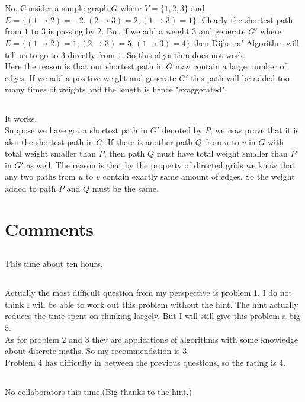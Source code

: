 \documentclass[12pt,letterpaper]{article}
\begin{document}
\section{}
\subsection{}
No. Consider a simple graph $G$ where $V=\{1,2,3\}$ and $E=\{(1\to2)=-2,(2\to3)=2,(1\to3)=1\}$. Clearly the shortest path from $1$ to $3$ is passing by $2$. But if we add a weight $3$ and generate $G'$ where $E=\{(1\to2)=1,(2\to3)=5,(1\to3)=4\}$ then Dijkstra' Algorithm will tell us to go to $3$ directly from $1$. So this algorithm does not work.\\
Here the reason is that our shortest path in $G$ may contain a large number of edges. If we add a positive weight and generate $G'$ this path will be added too many times of weights and the length is hence "exaggerated".
\subsection{}
It works. \\
Suppose we have got a shortest path in $G'$ denoted by $P$, we now prove that it is also the shortest path in $G$.
If there is another path $Q$ from $u$ to $v$ in $G$ with total weight smaller than $P$, then path $Q$ must have total weight smaller than $P$ in $G'$ as well. The reason is that by the property of directed grids we know that any two paths from $u$ to $v$ contain exactly same amount of edges. So the weight added to path $P$ and $Q$ must be the same.

\section{Comments}
\subsection{}
This time about ten hours.
\subsection{}
Actually the most difficult question from my perspective is problem 1. I do not think I will be able to work out this problem without the hint. The hint actually reduces the time spent on thinking largely. But I will still give this problem a big $5$.\\
As for problem $2$ and $3$ they are applications of algorithms with some knowledge about discrete maths. So my recommendation is $3$.\\
Problem 4 has difficulty in between the previous questions, so the rating is $4$.
\subsection{}
No collaborators this time.(Big thanks to the hint.)
\end{document}
